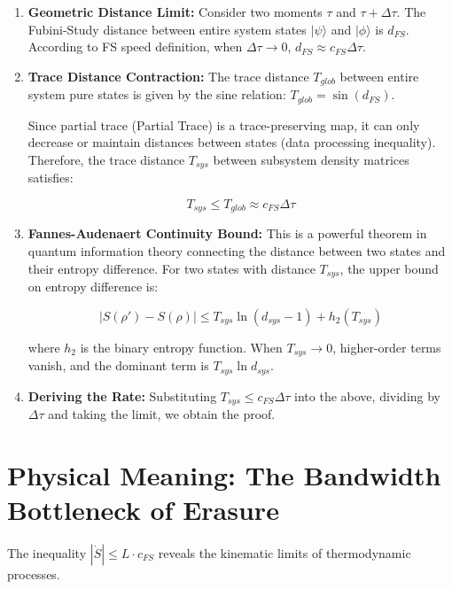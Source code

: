 \begin{enumerate}
\item \textbf{Geometric Distance Limit:} Consider two moments \textbf{$\tau$} and \textbf{$\tau + \Delta \tau$}. The Fubini-Study distance between entire system states \textbf{$|\psi\rangle$} and \textbf{$|\phi\rangle$} is \textbf{$d_{FS}$}. According to FS speed definition, when \textbf{$\Delta \tau \to 0$}, \textbf{$d_{FS} \approx c_{FS} \Delta \tau$}.

\item \textbf{Trace Distance Contraction:} The trace distance \textbf{$T_{glob}$} between entire system pure states is given by the sine relation: \textbf{$T_{glob} = \sin(d_{FS})$}.

   Since partial trace (Partial Trace) is a trace-preserving map, it can only decrease or maintain distances between states (data processing inequality). Therefore, the trace distance \textbf{$T_{sys}$} between subsystem density matrices satisfies:

   $$T_{sys} \le T_{glob} \approx c_{FS} \Delta \tau$$

\item \textbf{Fannes-Audenaert Continuity Bound:} This is a powerful theorem in quantum information theory connecting the distance between two states and their entropy difference. For two states with distance \textbf{$T_{sys}$}, the upper bound on entropy difference is:

   $$|S(\rho') - S(\rho)| \le T_{sys} \ln(d_{sys}-1) + h_2(T_{sys})$$

   where \textbf{$h_2$} is the binary entropy function. When \textbf{$T_{sys} \to 0$}, higher-order terms vanish, and the dominant term is \textbf{$T_{sys} \ln d_{sys}$}.

\item \textbf{Deriving the Rate:} Substituting \textbf{$T_{sys} \le c_{FS} \Delta \tau$} into the above, dividing by \textbf{$\Delta \tau$} and taking the limit, we obtain the proof.
\end{enumerate}

\section{Physical Meaning: The Bandwidth Bottleneck of Erasure}

The inequality \textbf{$|\dot{S}| \le L \cdot c_{FS}$} reveals the kinematic limits of thermodynamic processes.

